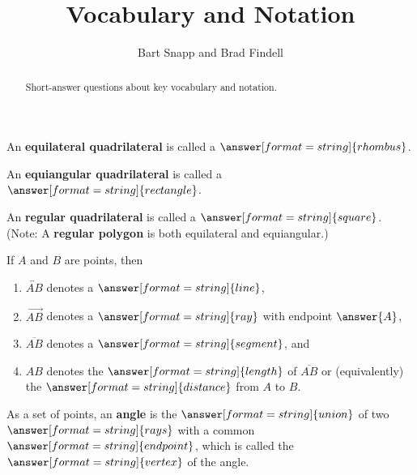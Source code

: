 \documentclass[nooutcomes]{ximera}
\title{Vocabulary and Notation}
\author{Bart Snapp and Brad Findell}
\begin{document}
\begin{abstract}
Short-answer questions about key vocabulary and notation. 
\end{abstract}
\maketitle


\begin{question}  
An \textbf{equilateral quadrilateral} is called a $\answer[format=string]{rhombus}$.
\end{question}

\begin{question}  
An \textbf{equiangular quadrilateral} is called a $\answer[format=string]{rectangle}$. 
\end{question}

\begin{question}  
An \textbf{regular quadrilateral} is called a $\answer[format=string]{square}$. (Note: A \textbf{regular polygon} is both equilateral and equiangular.)

\end{question}


\begin{question}
If $A$ and $B$ are points, then 
\begin{enumerate}
\item $\overleftrightarrow{AB}$ denotes a $\answer[format=string]{line}$, 
\item $\overrightarrow{AB}$ denotes a $\answer[format=string]{ray}$ with endpoint $\answer{A}$,  
\item $\overline{AB}$ denotes a $\answer[format=string]{segment}$, and 
\item $AB$ denotes the $\answer[format=string]{length}$ of $\overline{AB}$ or (equivalently) the $\answer[format=string]{distance}$ from $A$ to $B$.  
\end{enumerate}
\end{question}


\begin{question}
As a set of points, an \textbf{angle} is the $\answer[format=string]{union}$ of two $\answer[format=string]{rays}$ with a common $\answer[format=string]{endpoint}$, which is called the $\answer[format=string]{vertex}$ of the angle.  \end{question}
\end{document}
